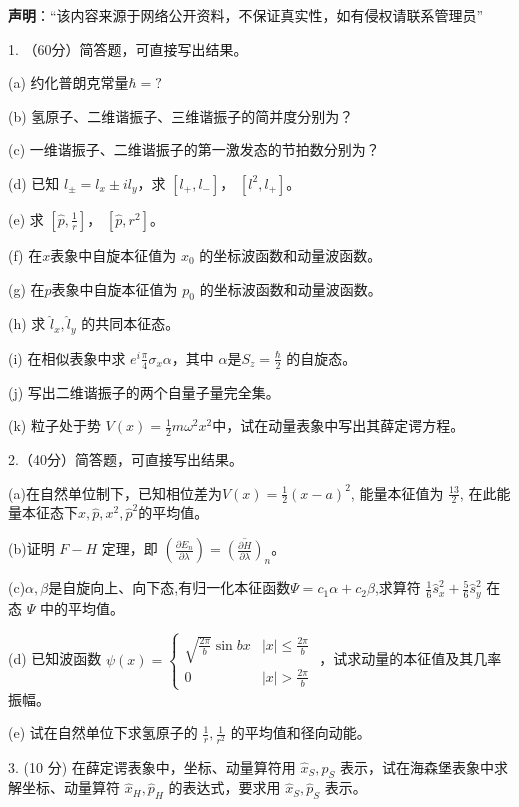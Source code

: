 
\textbf{声明}：“该内容来源于网络公开资料，不保证真实性，如有侵权请联系管理员”

1. （60分）简答题，可直接写出结果。

(a) 约化普朗克常量$\hbar = ?$

(b) 氢原子、二维谐振子、三维谐振子的简并度分别为？

(c) 一维谐振子、二维谐振子的第一激发态的节拍数分别为？

(d) 已知 $l_\pm = l_x \pm il_y $，求 $[l_+, l_-]$， $[l^2, l_+]$。

(e) 求 $[\hat p, \frac{1}{r}]$， $[\hat p, r^2]$。

(f) 在$x$表象中自旋本征值为 $x_0$ 的坐标波函数和动量波函数。

(g) 在$p$表象中自旋本征值为 $p_0$ 的坐标波函数和动量波函数。

(h) 求 $\hat l_x,\hat l_y$ 的共同本征态。

(i) 在相似表象中求 $e^i\frac{\pi}{4}\sigma_x\alpha$，其中 $\alpha$是$S_z =\frac{\hbar}{2} $ 的自旋态。

(j) 写出二维谐振子的两个自量子量完全集。

(k) 粒子处于势 $V(x) = \frac{1}{2}m\omega^2x^2$中，试在动量表象中写出其薛定谔方程。

2.（40分）简答题，可直接写出结果。

(a)在自然单位制下，已知相位差为$V(x) = \frac{1}{2} (x-a)^2$, 能量本征值为 $\frac{13}{2}$, 在此能量本征态下$x,\hat p,x^2,\hat p^2$的平均值。

(b)证明 $F-H$ 定理，即 
$\left( \frac{\partial E_{n}}{\partial \lambda} \right) = \overline{(\frac{\partial H}{\partial \lambda})} _n$。

(c)$\alpha,\beta$是自旋向上、向下态,有归一化本征函数$\Psi=c_1\alpha+c_2\beta$,求算符 $\frac{1}{6}\hat s_x^2 + \frac{5}{6}\hat s_y^2$ 在态 $\Psi$ 中的平均值。

(d) 已知波函数 $\psi(x) = 
\begin{cases} 
\sqrt{\frac{2\pi}{b}} \sin{bx} & |x| \leq \frac{2\pi}{b} \\
0 & |x| > \frac{2\pi}{b} 
\end{cases}$ ，试求动量的本征值及其几率振幅。

(e) 试在自然单位下求氢原子的 $\frac{1}{r},\frac{1}{r^2}$ 的平均值和径向动能。

3. (10 分) 在薛定谔表象中，坐标、动量算符用 $\hat x_S,\hat p_S$ 表示，试在海森堡表象中求解坐标、动量算符 $\hat x_H, \hat p_{H}$ 的表达式，要求用 $\hat x_S,\hat p_S$ 表示。

